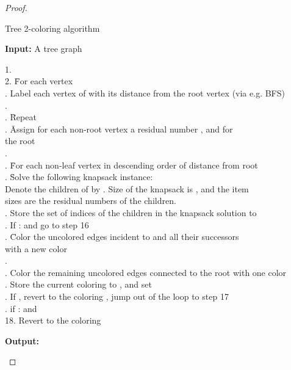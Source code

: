 \documentclass[runningheads, a4paper]{llncs}
\begin{document}
\begin{proof}
\begin{algorithm}[H]
\caption{Tree 2-coloring algorithm}
\label{alg:polytree}
\textbf{Input:} A tree graph 
\begin{tabbing}
1.  \\
2. \= For each vertex  \\
   . Label each vertex of  with its distance from the root vertex (via e.g. BFS) \\
   .  \\
   . \= Repeat \\
   \>    . \= Assign for each non-root vertex  a residual number , and for \\
   \>    \>    \> the root  \\
   \>    .  \\
   \>    . \= For each non-leaf vertex in descending order of distance from root \\
   \>    \>    . \= Solve the following knapsack instance: \\
   \>    \>    \>    \> Denote the children of  by . Size of the knapsack is , and the item \\
   \>    \>    \>    \> sizes are the residual numbers  of the children. \\
   \>    \>    . Store the set of indices of the children in the knapsack solution to  \\
   \>    \>    . If :  and go to step 16 \\
   \>    \>    . \= Color the uncolored edges incident to  and all their successors \\
   \>    \>    \>    \> with a new color \\
   \>    \>    .  \\
   \>    . Color the remaining uncolored edges connected to the root with one color \\
   \>    . Store the current coloring to , and set  \\
   \>    . If , revert to the coloring , jump out of the loop to step 17 \\
   . if :  and  \\
18. Revert to the coloring  \\
\end{tabbing}
\textbf{Output:} 
\end{algorithm}


\end{proof}
\end{document}
